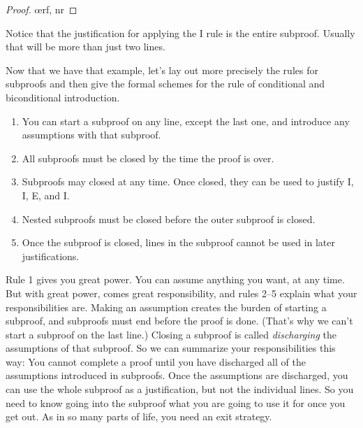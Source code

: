 \begin{proof}
	\open
		\oe{rf, nr}
	\close
\end{proof}

Notice that the justification for applying the {\eif}I rule is the entire subproof. Usually that will be more than just two lines.


Now that we have that example, let's lay out more precisely the rules for subproofs and then give the formal schemes for the rule of conditional and biconditional introduction. 

\begin{enumerate}[leftmargin=1.5cm]
\item[\define{Rule 1}] You can start a subproof on any line, except the last one, and introduce any assumptions with that subproof.
\item[\define{Rule 2}] All subproofs must be closed by the time the proof is over.
\item[\define{Rule 3}] Subproofs may closed at any time. Once closed, they can be used to justify \eif I, \eiff I, \enot E, and \enot I.
\item[\define{Rule 4}] Nested subproofs must be closed before the outer subproof is closed.
\item[\define{Rule 5}] Once the subproof is closed, lines in the subproof cannot be used in later justifications.
\end{enumerate}

Rule 1 gives you great power. You can assume anything you want, at any time. But with great power, comes great responsibility, and rules 2--5 explain what your responsibilities are. Making an assumption creates the burden of starting a subproof, and subproofs must end before the proof is done. (That's why we can't start a subproof on the last line.) Closing a subproof is called \emph{discharging} the assumptions of that subproof. So we can summarize your responsibilities this way: You cannot complete a proof until you have discharged all of the assumptions introduced in subproofs. Once the assumptions are discharged, you can use the whole subproof as a justification, but not the individual lines. So you need to know going into the subproof what you are going to use it for once you get out. As in so many parts of life, you need an exit strategy.  

